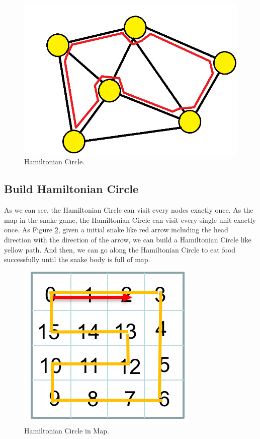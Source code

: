 \documentclass[12pt]{article}
\begin{document}
\begin{figure}[H]
\centering 
\includegraphics[scale = 0.4]{Hamiltonian.png}
\caption{Hamiltonian Circle.}
\label{fig:figure1label}
\end{figure}

\subsection{Build Hamiltonian Circle}
As we can see, the Hamiltonian Circle can visit every nodes exactly once. As the map in the snake game, the Hamiltonian Circle can visit every single unit exactly once. As Figure \ref{fig:figure2label}, given a initial snake like red arrow including the head direction with the direction of the arrow, we can build a Hamiltonian Circle like yellow path. And then, we can go along the Hamiltonian Circle to eat food successfully until the snake body is full of map. 

\begin{figure}[H]
\centering 
\includegraphics[scale = 0.8]{Picture1.png}
\caption{Hamiltonian Circle in Map.}
\label{fig:figure2label}
\end{figure}
\end{document}
